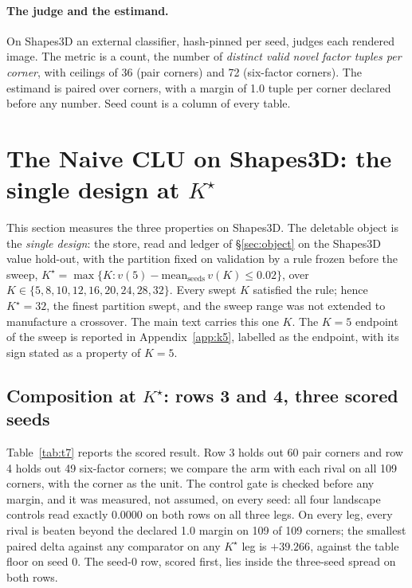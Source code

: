 \documentclass{article} %
\newcommand{\Kstar}{\ensuremath{K^{\star}}}
\begin{document}
\paragraph{The judge and the estimand.} On Shapes3D an external classifier, hash-pinned per seed, judges each rendered image. The metric is a count, the number of \emph{distinct
valid novel factor tuples per corner}, with ceilings of 36 (pair corners) and 72 (six-factor
corners). The estimand is paired over corners, with a margin of 1.0 tuple per corner declared
before any number. %
Seed count is a column of every table.

\section{The Naive CLU on Shapes3D: the single design at $\Kstar$}
\label{sec:shapes}

This section measures the three properties on Shapes3D. The deletable object is the \emph{single design}: the store, read and ledger of
\S\ref{sec:object} on the Shapes3D value hold-out, with the partition fixed on validation
by a rule frozen before the sweep, $\Kstar=\max\{K : v(5)-\text{mean}_{\text{seeds}}\,v(K)\le
0.02\}$, over $K\in\{5,8,10,12,16,20,24,28,32\}$. Every swept $K$ satisfied the rule; hence
$\Kstar=32$, the finest partition swept, and the sweep range was not extended to manufacture a
crossover. %
The main text carries this one $K$. The $K=5$ endpoint of the sweep is reported in
Appendix~\ref{app:k5}, labelled as the endpoint, with its sign stated as a property of $K=5$.

\subsection{Composition at $\Kstar$: rows 3 and 4, three scored seeds}
\label{sec:shapes-t7}

Table~\ref{tab:t7} reports the scored result. Row 3 holds out 60 pair corners and row 4 holds
out 49 six-factor corners; we compare the arm with each rival on all 109 corners, with the corner
as the unit. %
The control gate is checked before any margin, and it was measured, not assumed, on every seed:
all four landscape controls read exactly 0.0000 on both rows on all three legs.
On every leg, every rival is beaten beyond the declared 1.0 margin on 109 of 109 corners; the
smallest paired delta against any comparator on any $\Kstar$ leg is $+39.266$, against the
table floor on seed 0. %
The seed-0 row, scored first, lies inside the three-seed spread on both rows.
\end{document}
